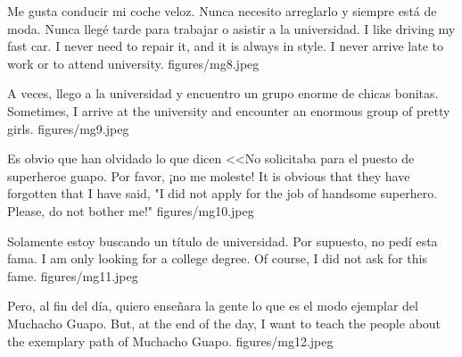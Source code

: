 \documentclass[10pt,twoside,openany]{book}
\begin{document}
  \storyspread
  {Me gusta conducir mi coche veloz.  Nunca necesito arreglarlo y siempre está de moda.  Nunca llegé tarde para trabajar o asistir a la universidad.}
  {I like driving my fast car. I never need to repair it, and it is always in style.  I never arrive late to work or to attend university.}
  {figures/mg8.jpeg}

  \storyspread
  {A veces, llego a la universidad y encuentro un grupo enorme de chicas bonitas.}
  {Sometimes, I arrive at the university and encounter an enormous group of pretty girls.}
  {figures/mg9.jpeg}

  \storyspread
  {Es obvio que han olvidado lo que dicen <<No solicitaba para el puesto de superheroe guapo.  Por favor, ¡no me moleste!}
  {It is obvious that they have forgotten that I have said, "I did not apply for the job of handsome superhero.  Please, do not bother me!"}
  {figures/mg10.jpeg}

  \storyspread
  {Solamente estoy buscando un título de universidad.  Por supuesto, no pedí esta fama.}
  {I am only looking for a college degree.  Of course, I did not ask for this fame.}
  {figures/mg11.jpeg}

  \storyspread
  {Pero, al fin del día, quiero enseñara la gente lo que es el modo ejemplar del Muchacho Guapo.}
  {But, at the end of the day, I want to teach the people about the exemplary path of Muchacho Guapo.}
  {figures/mg12.jpeg}
\end{document}
